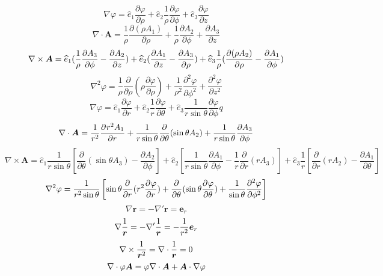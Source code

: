 \documentclass[UTF8,9pt]{ctexart}
\begin{document}
$$\nabla \varphi = \hat e_1 \frac { \partial \varphi } { \partial \rho } + \hat e_2 \frac { 1 } { \rho } \frac { \partial \varphi } { \partial \phi } + \hat { e } _ { 3 } \frac { \partial \varphi } { \partial z }$$
$$\nabla \cdot \bm{ A } = \frac { 1 } { \rho } \frac { \partial ( \rho A _ { 1 } ) } { \partial \rho } + \frac { 1 } { \rho } \frac { \partial A _ { 2 } } { \partial \phi } + \frac { \partial A _ { 3 } } { \partial z }$$
$$ { \nabla \times \bm{ A } } =\hat e_1 (\ff{\rho} \frac { \partial A_3} { \partial \phi } - \frac { \partial A _ { 2 } } { \partial z } ) + \hat { e } _ { 2 } ( \frac { \partial A _ { 1 } } { \partial z } - \frac { \partial A _ { 3 } } { \partial \rho } ) + \hat { e } _ { 3 } \frac { 1 } { \rho } ( \frac { \partial ( \rho A _ { 2 } ) } { \partial \rho } - \frac { \partial A _ { 1 } } { \partial \phi } )$$
$$\nabla ^ { 2 } \varphi = \frac { 1 } { \rho } \frac { \partial } { \partial \rho } ( \rho \frac { \partial \varphi } { \partial \rho } ) + \frac { 1 } { \rho ^ { 2 } } \frac { \partial ^ { 2 } \varphi } { \partial \phi ^ { 2 } } + \frac { \partial ^ { 2 } \varphi } { \partial z ^ { 2 } }$$
$$\nabla \varphi = \hat { e } _ { 1 } \frac { \partial \varphi } { \partial r } + \hat { e } _ { 2 } \frac { 1 } { r } \frac { \partial \varphi } { \partial \theta } + \hat { e } _ { 3 } \frac { 1 } { r \sin \theta } \frac { \partial \varphi } { \partial \phi }q$$
$$\nabla \cdot \bm{ A } = \ff{r^2} \pp{r^2A_1}{r} + \frac { 1 } { r \sin \theta } \frac { \partial } { \partial \theta } ( \sin \theta A _ { 2 } ) + \frac { 1 } { r \sin \theta } \frac { \partial A _ { 3 } } { \partial \phi }$$
$$\nabla \times \bm{ A }  = 
\hat { e } _ { 1 } \frac { 1 } { r \sin \theta } \left[ \frac { \partial } { \partial \theta } ( \sin \theta A _ { 3 } ) - \frac { \partial A _ { 2 } } { \partial \phi } \right]  
+ \hat { e } _ { 2 } \left[ \frac { 1 } { r \sin \theta } \frac { \partial A _ { 1 } } { \partial \phi } - \frac { 1 } { r } \frac { \partial } { \partial r } ( r A _ { 3 } ) \right] 
+ \hat { e } _ { 3 } \frac { 1 } { r } \left[ \frac { \partial } { \partial r } ( r A _ { 2 } ) - \frac { \partial A _ { 1 } } { \partial \theta } \right] $$
$$\nabla^2\varphi=\ff{r^2\sin\t}\left[\sin\t\pp{}{r}(r^2\pp{\varphi}{r})+\pp{}{\t}(\sin\t\pp{\varphi}{\t})+\ff{\sin\t}\pp[2]{\varphi}{\phi}\right]$$
$$\nabla\bm{r}=-\nabla'\bm{r}=\bm{e}_r$$
$$\nabla\ff{\bm{r}}=-\nabla'\ff{\bm{r}}=-\ff{r^2}\bm{e}_r$$
$$\curl\ff{\bm{r}^2}=\div\ff{\bm{r}}=0$$
$$\div\vp\bm{A}=\vp\div\bm{A}+\bm{A}\cdot\grad\vp$$
\end{document}
